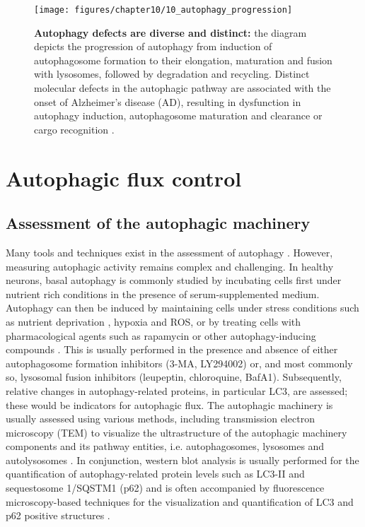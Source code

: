 \begin{figure}[H]
  \texttt{[image: figures/chapter10/10\_autophagy\_progression]}
  \caption[Diverse and distinct autophagy defects]{\textbf{Autophagy defects are diverse and distinct:} the diagram depicts the progression of autophagy from induction of autophagosome formation to their elongation, maturation and fusion with lysosomes, followed by degradation and recycling. Distinct molecular defects in the autophagic pathway are associated with the onset of Alzheimer’s disease (AD), resulting in dysfunction in autophagy induction, autophagosome maturation and clearance or cargo recognition \citep{lumkwana2017}.}
  \label{fig:10_autophagy_progression}
\end{figure}

\section{Autophagic flux control}
\subsection{Assessment of the autophagic machinery}
Many tools and techniques exist in the assessment of autophagy \citep{klionsky2016}. However, measuring autophagic activity remains complex and challenging. In healthy neurons, basal autophagy is commonly studied by incubating cells first under nutrient rich conditions in the presence of serum-supplemented medium. Autophagy can then be induced by maintaining cells under stress conditions such as nutrient deprivation \citep{Alirezaei2010}, hypoxia and ROS, or by treating cells with pharmacological agents such as rapamycin or other autophagy-inducing compounds \citep{Boland2008,Rose2010}. This is usually performed in the presence and absence of either autophagosome formation inhibitors (3-MA, LY294002) or, and most commonly so, lysosomal fusion inhibitors (leupeptin, chloroquine, BafA1). Subsequently, relative changes in autophagy-related proteins, in particular LC3, are assessed; these would be indicators for autophagic flux. The autophagic machinery is usually assessed using various methods, including transmission electron microscopy (TEM) to visualize the ultrastructure of the autophagic machinery components and its pathway entities, i.e. autophagosomes, lysosomes and autolysosomes \citep{klionsky2016}. In conjunction, western blot analysis is usually performed for the quantification of autophagy-related protein levels such as LC3-II and sequestosome 1/SQSTM1 (p62) and is often accompanied by fluorescence microscopy-based techniques for the visualization and quantification of LC3 and p62 positive structures \citep{klionsky2016,Klionsky2012,Mizushima2007,Swanlund2010}.

